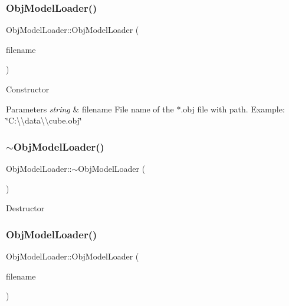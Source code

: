 \subsubsection{\texorpdfstring{Obj\+Model\+Loader()}{ObjModelLoader()}\hspace{0.1cm}{\footnotesize\ttfamily [2/3]}}
{\footnotesize\ttfamily Obj\+Model\+Loader\+::\+Obj\+Model\+Loader (\begin{DoxyParamCaption}\item[{string}]{filename }\end{DoxyParamCaption})}

Constructor 
\begin{DoxyParams}{Parameters}
{\em string} & filename File name of the $\ast$.obj file with path. Example\+: \char`\"{}\+C\+:\textbackslash{}\textbackslash{}data\textbackslash{}\textbackslash{}cube.\+obj\char`\"{} \\
\hline
\end{DoxyParams}
\mbox{\label{class_obj_model_loader_a203757d2c67c25889be3d61f140bc365}} 
\subsubsection{\texorpdfstring{$\sim$\+Obj\+Model\+Loader()}{~ObjModelLoader()}\hspace{0.1cm}{\footnotesize\ttfamily [2/3]}}
{\footnotesize\ttfamily Obj\+Model\+Loader\+::$\sim$\+Obj\+Model\+Loader (\begin{DoxyParamCaption}{ }\end{DoxyParamCaption})}

Destructor \mbox{\label{class_obj_model_loader_afcdb98fbbeba6fa0551b772ca959347d}} 
\subsubsection{\texorpdfstring{Obj\+Model\+Loader()}{ObjModelLoader()}\hspace{0.1cm}{\footnotesize\ttfamily [3/3]}}
{\footnotesize\ttfamily Obj\+Model\+Loader\+::\+Obj\+Model\+Loader (\begin{DoxyParamCaption}\item[{string}]{filename }\end{DoxyParamCaption})}

